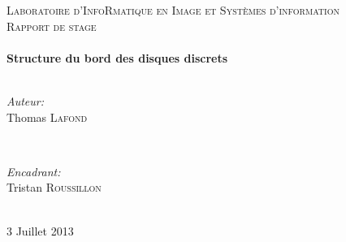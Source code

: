 \documentclass[12pt]{article} %
\begin{document}
\begin{titlepage}

\center %

\textsc{\LARGE Laboratoire d'InfoRmatique en Image et Syst\`{e}mes d'information}\\[1.5cm] %
\textsc{\large Rapport de stage}\\[0.5cm] %

\HRule \\[0.4cm]
{ \huge \bfseries Structure du bord des disques discrets}\\[0.4cm] %
\HRule \\[1.5cm]

\begin{minipage}{0.4\textwidth}
\begin{flushleft} \large
\emph{Auteur:}\\
Thomas \textsc{Lafond} %
\end{flushleft}
\end{minipage}
~
\begin{minipage}{0.4\textwidth}
\begin{flushright} \large
\emph{Encadrant:} \\
Tristan \textsc{Roussillon} %
\end{flushright}
\end{minipage}\\[4cm]

{\large 3 Juillet 2013}\\[3cm] %


\vfill %

\end{titlepage}


\tableofcontents %

\newpage %
\end{document}

